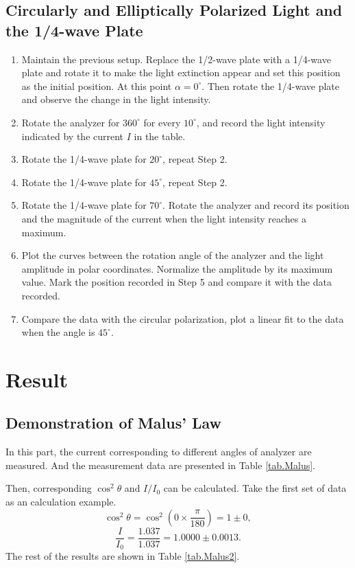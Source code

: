 \documentclass{article}
\begin{document}
\subsection{Circularly and Elliptically Polarized Light and the 1/4-wave Plate}
\begin{enumerate}
\item Maintain the previous setup. Replace the 1/2-wave plate with a 1/4-wave plate and rotate it to make the light extinction appear and set this position as the initial position. At this point $\alpha = 0^\circ$. Then rotate the 1/4-wave plate and observe the change in the light intensity.
\item Rotate the analyzer for $360^\circ$  for every $10^{\circ}$,  and record the light intensity indicated by the current $I$ in the table.
\item Rotate the 1/4-wave plate for $20^\circ$, repeat Step 2.
\item Rotate the 1/4-wave plate for $45^\circ$, repeat Step 2.
\item Rotate the 1/4-wave plate for $70^\circ$. Rotate the analyzer and record its position and the magnitude of the current when the light intensity reaches a maximum.
\item Plot the curves between the rotation angle of the analyzer and the light amplitude in polar coordinates. Normalize the amplitude by its maximum value. Mark the position recorded in Step 5 and compare it with the data recorded. 
\item Compare the data with the circular polarization, plot a linear fit to the data when the angle is $45^\circ$.
\end{enumerate}



		\section{Result}
\subsection{Demonstration of Malus' Law}
In this part, the current corresponding to different angles of analyzer are measured. And the measurement data are presented in Table \ref{tab.Malus}. 

Then,  corresponding $\cos^2\theta$ and $I/I_0$ can be calculated. 
Take the first set of data as an calculation example.
$$\cos^2\theta = \cos^2(0 \times \frac{\pi}{180}) = 1 \pm 0,$$
$$\frac{I}{I_0} = \frac{1.037}{1.037} = 1.0000 \pm 0.0013.$$
The rest of the results are shown in Table \ref{tab.Malus2}.
\end{document}
